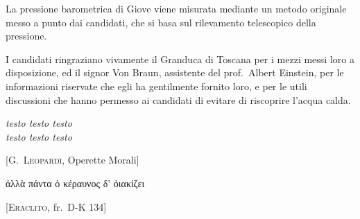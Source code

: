 \documentclass[%
corpo=12pt,
twoside,
stile=classica,
tipotesi=magistrale,
folioinhead,
]{toptesi}
\begin{document}
\newtheorem{osservazione}{Osservazione}%



%


\sommario%

La pressione barometrica di Giove viene misurata
mediante un metodo originale  messo a punto dai candidati, che si basa
sul rilevamento telescopico della pressione.

\ringraziamenti%

I candidati ringraziano vivamente il Granduca di Toscana per i mezzi
messi loro a disposizione, ed il signor Von Braun, assistente del
prof.~Albert Einstein, per le informazioni riservate che egli ha
gentilmente fornito loro, e per le utili discussioni che hanno permesso
ai candidati di evitare di riscoprire l'acqua calda.

\tablespagetrue\figurespagetrue %
\indici%

    \begin{citazioni}
        \textit{testo testo testo\\testo testo testo}

        [\textsc{G.\ Leopardi}, Operette Morali]

        \begin{greek}
        ἀλλὰ πάντα ὁ κέραυνος δ' ὀιακίζει
        \end{greek}

        [\textsc{Eraclito}, fr.\ D-K 134]
    \end{citazioni}
\end{document}
